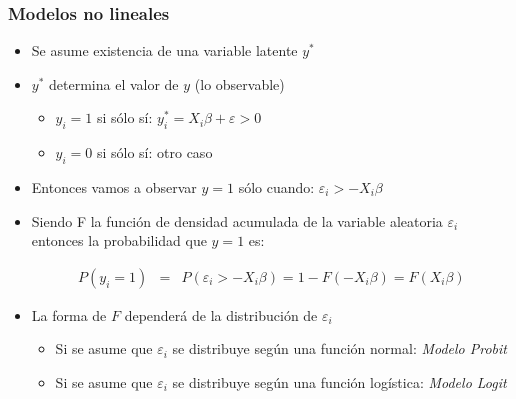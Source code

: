 \begin{frame}[fragile]
	\frametitle{Modelos no lineales}
	\begin{itemize}
		\item Se asume existencia de una variable latente $y^*$
		
		\item $y^*$ determina el valor de $y$ (lo observable)
		
		\begin{itemize}
			\item $y_i=1$ si sólo sí: $y_i^*=X_i\beta+\varepsilon>0$
			\item $y_i=0$ si sólo sí: otro caso
		\end{itemize}
		\item Entonces vamos a observar $y=1$ sólo cuando: $\varepsilon_i>-X_i\beta$
		
		\item Siendo F la función de densidad acumulada de la variable aleatoria $\varepsilon_i$
		entonces la probabilidad que $y=1$ es:
		
		\begin{eqnarray*}
			P(y_i=1) &=& P(\varepsilon_i>-X_i\beta)=1-F(-X_i\beta)=F(X_i\beta)
		\end{eqnarray*}
		
		\item La forma de $F$ dependerá de la distribución de $\varepsilon_i$
		\begin{itemize}
			\item Si se asume que $\varepsilon_i$ se distribuye según
			una función normal: \emph{Modelo Probit}
			\item Si se asume que $\varepsilon_i$ se distribuye
			según una función logística: \emph{Modelo Logit}
		\end{itemize}
	\end{itemize}
\end{frame}

